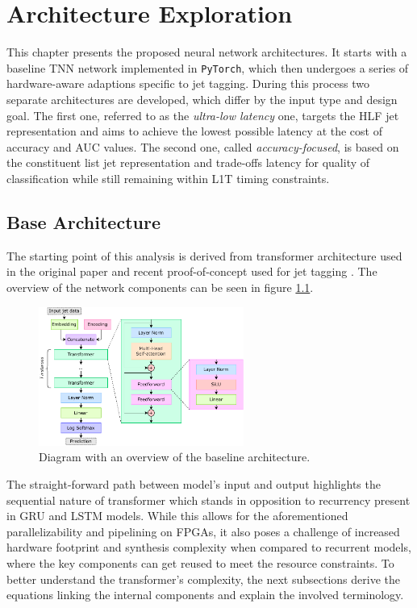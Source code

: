 \chapter{Architecture Exploration}\label{models}
This chapter presents the proposed neural network architectures. It starts with a baseline TNN network implemented in \texttt{PyTorch}, which then undergoes a series of hardware-aware adaptions specific to jet tagging. During this process two separate architectures are developed, which differ by the input type and design goal. The first one, referred to as the \textit{ultra-low latency} one, targets the HLF jet representation and aims to achieve the lowest possible latency at the cost of accuracy and AUC values. The second one, called \textit{accuracy-focused}, is based on the constituent list jet representation and trade-offs latency for quality of classification while still remaining within L1T timing constraints.


\section{Base Architecture}
The starting point of this analysis is derived from transformer architecture used in the original paper \cite{44-vaswani2017attention} and recent proof-of-concept used for jet tagging \cite{3-yuan2021constituentnet:}. The overview of the network components can be seen in figure \ref{fig:constituent-net}.

\begin{figure}[hpt!]
  \centering
  \includegraphics[trim={0cm 0cm 0cm 0cm}, width=0.6\textwidth, center]{models/constituent_net.pdf}
  \caption{Diagram with an overview of the baseline architecture.}
  \label{fig:constituent-net}
\end{figure}

The straight-forward path between model's input and output highlights the sequential nature of transformer which stands in opposition to recurrency present in GRU and LSTM models. While this allows for the aforementioned parallelizability and pipelining on FPGAs, it also poses a challenge of increased hardware footprint and synthesis complexity when compared to recurrent models, where the key components can get reused to meet the resource constraints. To better understand the transformer's complexity, the next subsections derive the equations linking the internal components and explain the involved terminology.


